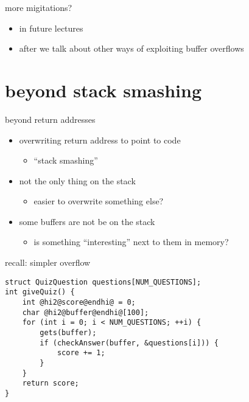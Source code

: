 \begin{frame}{more migitations?}
    \begin{itemize}
    \item in future lectures
    \item after we talk about other ways of exploiting buffer overflows
    \end{itemize}
\end{frame}

\section{beyond stack smashing}

\begin{frame}{beyond return addresses}
     \begin{itemize}
    \item overwriting return address to point to code
        \begin{itemize}
        \item ``stack smashing''
        \end{itemize}
    \item not the only thing on the stack
        \begin{itemize}
        \item easier to overwrite something else?
        \end{itemize}
    \item some buffers are not be on the stack
        \begin{itemize}
        \item is something ``interesting'' next to them in memory?
        \end{itemize}
    \end{itemize}
\end{frame}


\begin{frame}[fragile,label=overwriteLocal]{recall: simpler overflow}
\begin{lstlisting}
struct QuizQuestion questions[NUM_QUESTIONS];
int giveQuiz() {
    int @hi2@score@endhi@ = 0;
    char @hi2@buffer@endhi@[100];
    for (int i = 0; i < NUM_QUESTIONS; ++i) {
        gets(buffer);
        if (checkAnswer(buffer, &questions[i])) {
            score += 1;
        }
    }
    return score;
}
\end{lstlisting}
\end{frame}


